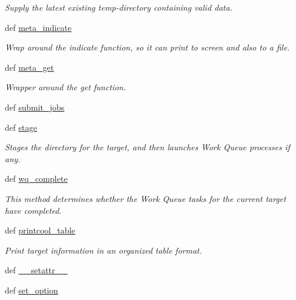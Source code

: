 \begin{DoxyCompactItemize}
\begin{DoxyCompactList}\small\item\em Supply the latest existing temp-\/directory containing valid data. \end{DoxyCompactList}\item 
def \hyperlink{classforcebalance_1_1target_1_1Target_a99c84ef8ea504d7699c927e261f648e4}{meta\-\_\-indicate}
\begin{DoxyCompactList}\small\item\em Wrap around the indicate function, so it can print to screen and also to a file. \end{DoxyCompactList}\item 
def \hyperlink{classforcebalance_1_1target_1_1Target_a17c8ac0c7dd0a0430accddfd12602103}{meta\-\_\-get}
\begin{DoxyCompactList}\small\item\em Wrapper around the get function. \end{DoxyCompactList}\item 
def \hyperlink{classforcebalance_1_1target_1_1Target_a78cd29b94cbcc201eed99c78aaef46a4}{submit\-\_\-jobs}
\item 
def \hyperlink{classforcebalance_1_1target_1_1Target_af8d2a4658c87841e40296795aec478bb}{stage}
\begin{DoxyCompactList}\small\item\em Stages the directory for the target, and then launches Work Queue processes if any. \end{DoxyCompactList}\item 
def \hyperlink{classforcebalance_1_1target_1_1Target_af6099ec09486213869dba2491bd8ea04}{wq\-\_\-complete}
\begin{DoxyCompactList}\small\item\em This method determines whether the Work Queue tasks for the current target have completed. \end{DoxyCompactList}\item 
def \hyperlink{classforcebalance_1_1target_1_1Target_ac30a4e9d7d9fe06f7caefa5f7cfab09b}{printcool\-\_\-table}
\begin{DoxyCompactList}\small\item\em Print target information in an organized table format. \end{DoxyCompactList}\item 
def \hyperlink{classforcebalance_1_1BaseClass_a0c851d413c3b2f30561b72a46771bcff}{\-\_\-\-\_\-setattr\-\_\-\-\_\-}
\item 
def \hyperlink{classforcebalance_1_1BaseClass_a73e9a37a7632e79eb99f49bd15aced45}{set\-\_\-option}
\end{DoxyCompactItemize}
